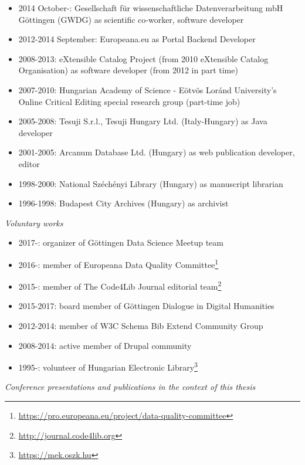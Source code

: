 \begin{itemize}
 \setlength{\parskip}{0pt}
 \setlength{\itemsep}{0pt plus 1pt}
\item 2014 October-: Gesellschaft für wissenschaftliche Datenverarbeitung mbH Göttingen (GWDG) as scientific co-worker, software developer
\item 2012-2014 September: Europeana.eu as Portal Backend Developer
\item 2008-2013: eXtensible Catalog Project (from 2010 eXtensible Catalog Organisation) as software developer (from 2012 in part time)
\item 2007-2010: Hungarian Academy of Science - Eötvös Loránd University's Online Critical Editing special research group (part-time job)
\item 2005-2008: Tesuji S.r.l., Tesuji Hungary Ltd. (Italy-Hungary) as Java developer
\item 2001-2005: Arcanum Database Ltd. (Hungary) as web publication developer, editor
\item 1998-2000: National Széchényi Library (Hungary) as manuscript librarian
\item 1996-1998: Budapest City Archives (Hungary) as archivist
\end{itemize}

\emph{Voluntary works}
\begin{itemize}
 \setlength{\parskip}{0pt}
 \setlength{\itemsep}{0pt plus 1pt}
\item 2017-: organizer of Göttingen Data Science Meetup team
\item 2016-: member of Europeana Data Quality Committee\footnote{\url{https://pro.europeana.eu/project/data-quality-committee}}
\item 2015-: member of The Code4Lib Journal editorial team\footnote{\url{http://journal.code4lib.org}}
\item 2015-2017: board member of Göttingen Dialogue in Digital Humanities
\item 2012-2014: member of W3C Schema Bib Extend Community Group
\item 2008-2014: active member of Drupal community
\item 1995-: volunteer of Hungarian Electronic Library\footnote{\url{https://mek.oszk.hu}}
\end{itemize}

\emph{Conference presentations and publications in the context of this thesis}


